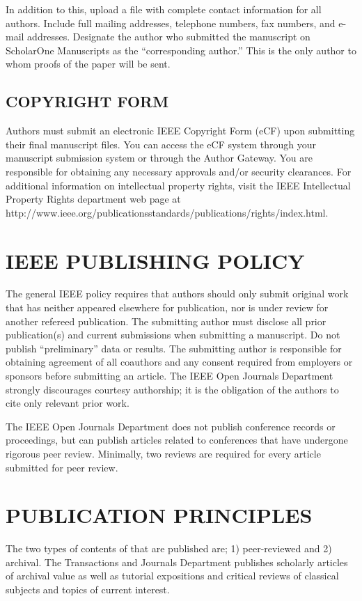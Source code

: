 \documentclass{IEEEoj}
\begin{document}
In addition to this, upload a file with complete contact information for all 
authors. Include full mailing addresses, telephone numbers, fax numbers, and 
e-mail addresses. Designate the author who submitted the manuscript on 
ScholarOne Manuscripts as the ``corresponding author.'' This is the only 
author to whom proofs of the paper will be sent. 

\subsection{COPYRIGHT FORM}
Authors must submit an electronic IEEE Copyright Form (eCF) upon submitting 
their final manuscript files. You can access the eCF system through your 
manuscript submission system or through the Author Gateway. You are 
responsible for obtaining any necessary approvals and/or security 
clearances. For additional information on intellectual property rights, 
visit the IEEE Intellectual Property Rights department web page at 
http://www.ieee.org/publications\textunderscore\discretionary{}{}{}standards/publications/rights/index.html. 

\section{IEEE PUBLISHING POLICY}
The general IEEE policy requires that authors should only submit original 
work that has neither appeared elsewhere for publication, nor is under 
review for another refereed publication. The submitting author must disclose 
all prior publication(s) and current submissions when submitting a 
manuscript. Do not publish ``preliminary'' data or results. The submitting 
author is responsible for obtaining agreement of all coauthors and any 
consent required from employers or sponsors before submitting an article. 
The IEEE Open Journals Department strongly discourages courtesy authorship; 
it is the obligation of the authors to cite only relevant prior work.

The IEEE Open Journals Department does not publish conference records or 
proceedings, but can publish articles related to conferences that have 
undergone rigorous peer review. Minimally, two reviews are required for 
every article submitted for peer review.

\section{PUBLICATION PRINCIPLES}
The two types of contents of that are published are; 1) peer-reviewed and 2) 
archival. The Transactions and Journals Department publishes scholarly 
articles of archival value as well as tutorial expositions and critical 
reviews of classical subjects and topics of current interest. 
\end{document}
